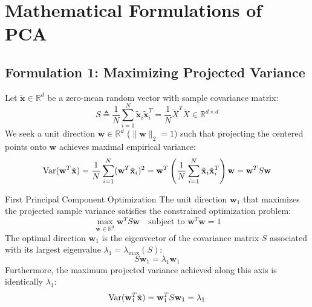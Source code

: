 \section{Mathematical Formulations of PCA}

\subsection{Formulation 1: Maximizing Projected Variance}
Let $\tilde{\mathbf{x}} \in \mathbb{R}^d$ be a zero-mean random vector with sample covariance matrix:
\begin{equation}
S \triangleq \frac{1}{N}\sum_{i=1}^N \tilde{\mathbf{x}}_i \tilde{\mathbf{x}}_i^T = \frac{1}{N}\tilde{X}^T \tilde{X} \in \mathbb{R}^{d \times d}
\end{equation}
We seek a unit direction $\mathbf{w} \in \mathbb{R}^d$ ($\|\mathbf{w}\|_2 = 1$) such that projecting the centered points onto $\mathbf{w}$ achieves maximal empirical variance:
\begin{equation}
\operatorname{Var}(\mathbf{w}^T \tilde{\mathbf{x}}) = \frac{1}{N} \sum_{i=1}^N (\mathbf{w}^T \tilde{\mathbf{x}}_i)^2 = \mathbf{w}^T \left( \frac{1}{N}\sum_{i=1}^N \tilde{\mathbf{x}}_i \tilde{\mathbf{x}}_i^T \right) \mathbf{w} = \mathbf{w}^T S \mathbf{w}
\end{equation}

\begin{theorembox}{First Principal Component Optimization}
The unit direction $\mathbf{w}_1$ that maximizes the projected sample variance satisfies the constrained optimization problem:
\begin{equation}
\max_{\mathbf{w} \in \mathbb{R}^d} \mathbf{w}^T S \mathbf{w} \quad \text{subject to } \mathbf{w}^T \mathbf{w} = 1
\label{eq:pca_var_opt}
\end{equation}
The optimal direction $\mathbf{w}_1$ is the eigenvector of the covariance matrix $S$ associated with its largest eigenvalue $\lambda_1 = \lambda_{\max}(S)$:
\begin{equation}
S \mathbf{w}_1 = \lambda_1 \mathbf{w}_1
\end{equation}
Furthermore, the maximum projected variance achieved along this axis is identically $\lambda_1$:
\begin{equation}
\operatorname{Var}(\mathbf{w}_1^T \tilde{\mathbf{x}}) = \mathbf{w}_1^T S \mathbf{w}_1 = \lambda_1
\end{equation}
\end{theorembox}

